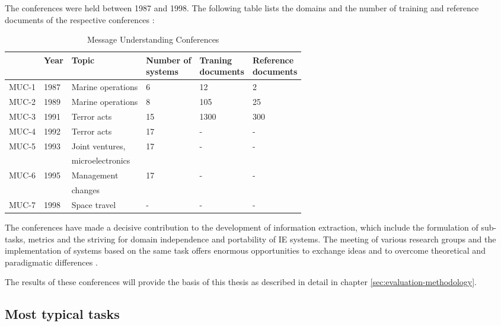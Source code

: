 The conferences were held between 1987 and 1998. The following table lists the domains and the number of training and reference documents of the respective conferences \cite{Turmo:2006}\cite{Appelt:1999}\cite{Cunningham:2005}\cite{Linsmayr:2010}:

\begin{table}[H]
\centering
\begin{tabular*}{\textwidth}{ l l l l l l }
	\toprule
	& Year & Topic & \shortstack{Number of \\ systems} & \shortstack{Traning \\ documents} & \shortstack{Reference \\ documents} \\
	\midrule
	MUC-1 & 1987 & Marine operations & 6 & 12 & 2 \\
	MUC-2 & 1989 & Marine operations & 8 & 105 & 25 \\
	MUC-3 & 1991 & Terror acts & 15 & 1300 & 300 \\
	MUC-4 & 1992 & Terror acts & 17 & - & - \\
	MUC-5 & 1993 & Joint ventures, & 17 & - & - \\
	& & microelectronics & & & \\
	MUC-6 & 1995 & Management & 17 & - & - \\
	& & changes & & & \\
	MUC-7 & 1998 & Space travel & - & - & - \\
	\bottomrule
\end{tabular*}
\caption{Message Understanding Conferences}
\end{table}

The conferences have made a decisive contribution to the development of information extraction, which include the formulation of sub-tasks, metrics and the striving for domain independence and portability of \gls{IE} systems. The meeting of various research groups and the implementation of systems based on the same task offers enormous opportunities to exchange ideas and to overcome theoretical and paradigmatic differences \cite{Cimiano:2003}\cite{Lehnert:1994}.

The results of these conferences will provide the basis of this thesis as described in detail in chapter \ref{sec:evaluation-methodology}.

\newpage
\subsection{Most typical tasks}

